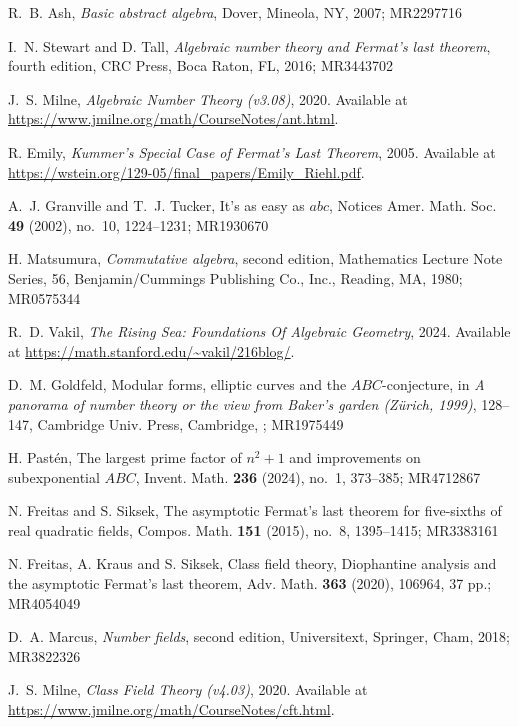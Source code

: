 \documentclass{article}
\begin{document}
\begin{thebibliography}{99}

R.~B. Ash, {\it Basic abstract algebra}, Dover, Mineola, NY, 2007; MR2297716

I.~N. Stewart and D. Tall, {\it Algebraic number theory and Fermat's last theorem}, fourth edition, 
CRC Press, Boca Raton, FL, 2016; MR3443702

J.~S. Milne, {\it Algebraic Number Theory (v3.08)}, 2020. Available at \url{https://www.jmilne.org/math/CourseNotes/ant.html}.

R. Emily, {\it Kummer's Special Case of Fermat's Last Theorem}, 2005.  Available at \url{https://wstein.org/129-05/final_papers/Emily_Riehl.pdf}.

A.~J. Granville and T.~J. Tucker, It's as easy as $abc$, Notices Amer. Math. Soc. {\bf 49} (2002), no.~10, 1224--1231; MR1930670

H. Matsumura, {\it Commutative algebra}, second edition, 
Mathematics Lecture Note Series, 56, Benjamin/Cummings Publishing Co., Inc., Reading, MA, 1980; MR0575344

R.~D. Vakil, {\it The Rising Sea: Foundations Of Algebraic Geometry}, 2024. Available at \url{https://math.stanford.edu/~vakil/216blog/}.

D.~M. Goldfeld, Modular forms, elliptic curves and the $ABC$-conjecture, in {\it A panorama of number theory or the view from Baker's garden (Z\"urich, 1999)}, 128--147, Cambridge Univ. Press, Cambridge, ; MR1975449

H. Past\'en, The largest prime factor of $n^2+1$ and improvements on subexponential $ABC$, Invent. Math. {\bf 236} (2024), no.~1, 373--385; MR4712867

N. Freitas and S. Siksek, The asymptotic Fermat's last theorem for five-sixths of real quadratic fields, Compos. Math. {\bf 151} (2015), no.~8, 1395--1415; MR3383161

N. Freitas, A. Kraus and S. Siksek, Class field theory, Diophantine analysis and the asymptotic Fermat's last theorem, Adv. Math. {\bf 363} (2020), 106964, 37 pp.; MR4054049

D.~A. Marcus, {\it Number fields}, second edition, 
Universitext, Springer, Cham, 2018; MR3822326

J.~S. Milne, {\it Class Field Theory (v4.03)}, 2020. Available at \url{https://www.jmilne.org/math/CourseNotes/cft.html}.


\end{thebibliography}
\end{document}
